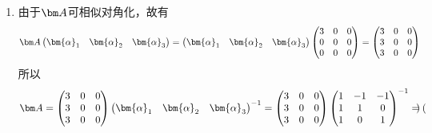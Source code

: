 \begin{solution}
\begin{enumerate}[(1)]
        \item 由于$\mat{A}$可相似对角化，故有
              \[
                  \mat{A}
                  \begin{pmatrix}
                      \bm{\alpha}_1 & \bm{\alpha}_2 & \bm{\alpha}_3
                  \end{pmatrix}
                  =
                  \begin{pmatrix}
                      \bm{\alpha}_1 & \bm{\alpha}_2 & \bm{\alpha}_3
                  \end{pmatrix}
                  \begin{pmatrix}
                      3 & 0 & 0 \\
                      0 & 0 & 0 \\
                      0 & 0 & 0
                  \end{pmatrix}
                  =
                  \begin{pmatrix}
                      3 & 0 & 0 \\
                      3 & 0 & 0 \\
                      3 & 0 & 0
                  \end{pmatrix}
              \]
              所以
              \[
                  \mat{A} =
                  \begin{pmatrix}
                      3 & 0 & 0 \\
                      3 & 0 & 0 \\
                      3 & 0 & 0
                  \end{pmatrix}
                  \begin{pmatrix}
                      \bm{\alpha}_1 & \bm{\alpha}_2 & \bm{\alpha}_3
                  \end{pmatrix}^{-1}
                  =
                  \begin{pmatrix}
                      3 & 0 & 0 \\
                      3 & 0 & 0 \\
                      3 & 0 & 0
                  \end{pmatrix}
                  \begin{pmatrix}
                      1 & -1 & -1 \\
                      1 & 1  & 0  \\
                      1 & 0  & 1
                  \end{pmatrix}^{-1}
                  =
                  \begin{pmatrix}

\end{pmatrix}\]
\end{enumerate}
\end{solution}
